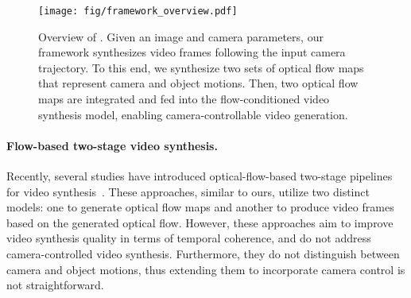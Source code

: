 \begin{figure*}[t!]
\centering
\texttt{[image: fig/framework\_overview.pdf]}
\vspace{-3mm}
\caption{
Overview of \MethodName{}.
Given an image and camera parameters, our framework synthesizes video frames following the input camera trajectory.
To this end, we synthesize two sets of optical flow maps that represent camera and object motions. Then, two optical flow maps are integrated and fed into the flow-conditioned video synthesis model, enabling camera-controllable video generation.
}
\vspace{-3mm}
\label{fig:framework_overview}
\end{figure*}


\paragraph{Flow-based two-stage video synthesis.}
Recently, several studies have introduced optical-flow-based two-stage pipelines for video synthesis~\cite{li2024generative, holynski2021animating, endo2019animating, mahapatra2022controllable, zhao2022thin, ni2023conditional, liang2024movideo}.
These approaches, similar to ours, utilize two distinct models: one to generate optical flow maps and another to produce video frames based on the generated optical flow.
However, these approaches aim to improve video synthesis quality in terms of temporal coherence, and do not address camera-controlled video synthesis.
Furthermore, they do not distinguish between camera and object motions, thus extending them to incorporate camera control is not straightforward.
